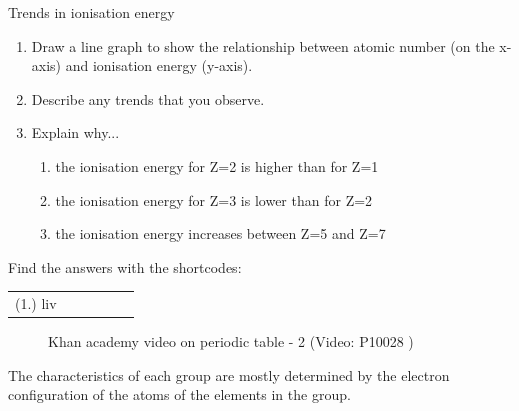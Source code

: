 \begin{exercises}{Trends in ionisation energy}
\begin{enumerate}[noitemsep, label=\textbf{\arabic*}. ]
\item{Draw a line graph to show the relationship between atomic number (on the x-axis) and ionisation energy (y-axis).}
\item{Describe any trends that you observe.}
\item{Explain why...
	\begin{enumerate}[noitemsep, label=\textbf{\arabic*}. ]
	\item{the ionisation energy for Z=2 is higher than for Z=1}
	\item{the ionisation energy for Z=3 is lower than for Z=2}
	\item{the ionisation energy increases between Z=5 and Z=7}
	\end{enumerate}
}
\end{enumerate}
      \label{m38757*secfhsst!!!underscore!!!id936}
\par {} Find the answers with the shortcodes:
 \par \begin{tabular}[h]{cccccc}
 (1.) liv  & \end{tabular}
\end{exercises}
        \par 
        \label{m38757*eip-6}
    \setcounter{subfigure}{0}
	\begin{figure}[H] %
    \textnormal{Khan academy video on periodic table - 2}\vspace{.1in} \nopagebreak
  \label{m38757*yt-media3}\label{m38757*yt-video3}
             { (Video:  P10028 )}
      \vspace{2pt}
    \vspace{.1in}
 \end{figure}       \par 
        \label{m38757*id261577}The characteristics of each group are mostly determined by the electron configuration of the atoms of the elements in the group.\par 
